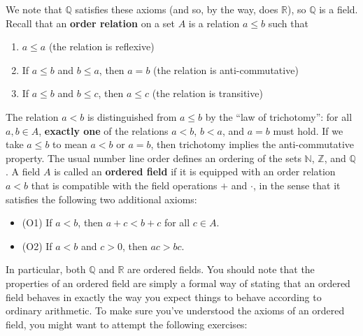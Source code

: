 \documentclass[letterpaper,12pt]{article}
\newcommand{\N}{\mathbb{N}}
\newcommand{\Z}{\mathbb{Z}}
\newcommand{\Q}{\mathbb{Q}}
\newcommand{\R}{\mathbb{R}}
\begin{document}
We note that $\Q$ satisfies these axioms (and so, by the way, does $\R$), so $\Q$ is a field. Recall that an {\bf order relation} on a set $A$ is a relation $a\leq b$ such that
\begin{enumerate}
 \item $a\leq a$ (the relation is reflexive)
 \item If $a\leq b$ and $b\leq a$, then $a=b$ (the relation is anti-commutative)
 \item If $a\leq b$ and $b\leq c$, then $a\leq c$ (the relation is transitive)
\end{enumerate}
The relation $a<b$ is distinguished from $a\leq b$ by the ``law of trichotomy'': for all $a,b\in A$, {\bf exactly one} of the relations $a<b$, $b<a$, and $a=b$ must hold. If we take $a\leq b$ to mean $a<b$ or $a=b$, then trichotomy implies the anti-commutative property. The usual number line order defines an ordering of the sets $\N$, $\Z$, and $\Q$. A field $A$ is called an {\bf ordered field} if it is equipped with an order relation $a<b$ that is compatible with the field operations $+$ and $\cdot$, in the sense that it satisfies the following two additional axioms:
\begin{itemize}
 \item (O1) If $a<b$, then $a+c<b+c$ for all $c\in A$.
 \item (O2) If $a<b$ and $c>0$, then $ac>bc$.
\end{itemize}
In particular, both $\Q$ and $\R$ are ordered fields. You should note that the properties of an ordered field are simply a formal way of stating that an ordered field behaves in exactly the way you expect things to behave according to ordinary arithmetic. To make sure you've understood the axioms of an ordered field, you might want to attempt the following exercises:
\end{document}
